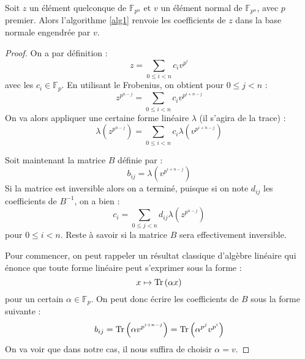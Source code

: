 \documentclass[a4paper]{article} %
\numberwithin{equation}{section}
\newcommand\GF[1]{\mathbb{F}_{#1}}
\newcommand\Tr[1]{\textup{Tr}\left(#1\right)}
\begin{document}
\begin{prop}
Soit $z$ un élément quelconque de $\GF{p^n}$ et $v$ un élément normal de $\GF{p^n}$, avec $p$ premier. Alors l'algorithme \ref{alg1} renvoie les coefficients de $z$ dans la base normale engendrée par $v$.
\end{prop}
\begin{proof}
On a par définition :
\[z = \sum_{0 \leq i < n}{c_iv^{p^i}}\]
avec les $c_i\in\GF{p}$. En utilisant le Frobenius, on obtient pour $0\leq j < n$ :
\[z^{p^{n-j}} = \sum_{0\leq i < n}{c_iv^{p^{i+n-j}}}\]
On va alors appliquer une certaine forme linéaire $\lambda$ (il s'agira de la trace) :
\[\lambda\left(z^{p^{n-j}}\right) = \sum_{0\leq i < n}{c_i\lambda\left(v^{p^{i+n-j}}\right)}\]\par
Soit maintenant la matrice $B$ définie par :
\[b_{ij} = \lambda\left(v^{p^{i+n-j}}\right)\]
Si la matrice est inversible alors on a terminé, puisque si on note $d_{ij}$ les coefficients de $B^{-1}$, on a bien :
\[c_i = \sum_{0\leq j < n}{d_{ij}\lambda\left(z^{p^{n-j}}\right)}\]
pour $0\leq i < n$. Reste à savoir si la matrice $B$ sera effectivement inversible.\par
Pour commencer, on peut rappeler un résultat classique d'algèbre linéaire qui énonce que toute forme linéaire peut s'exprimer sous la forme :
\[x \mapsto \Tr{\alpha x}\]
pour un certain $\alpha\in\GF{p}$. On peut donc écrire les coefficients de $B$ sous la forme suivante :
\[b_{ij} = \Tr{\alpha v^{p^{i+n-j}}} = \Tr{\alpha^{p^j}v^{p^i}}\]
On va voir que dans notre cas, il nous suffira de choisir $\alpha = v$.


\end{proof}
\end{document}
